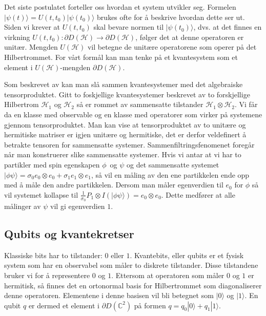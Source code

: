         Det siste postulatet forteller oss hvordan et system utvikler seg. Formelen $|\psi (t)\rangle = U(t,t_0)|\psi (t_0)\rangle$ brukes ofte for å beskrive hvordan dette ser ut. Siden vi krever at $U(t,t_0)$ skal bevare normen til $|\psi (t_0)\rangle$, dvs. at det finnes en virkning $U(t,t_0):\partial D(\mathcal{H})\rightarrow\partial D(\mathcal{H})$, følger det at denne operatoren er unitær. Mengden $U(\mathcal{H})$ vil betegne de unitære operatorene som operer på det Hilbertrommet. For vårt formål kan man tenke på et kvantesystem som et element i $U(\mathcal{H})$-mengden $\partial D(\mathcal{H})$.

        Som beskrevet av \cite{portugal_2019} kan man slå sammen kvantesystemer med det algebraiske tensorproduktet. Gitt to foskjellige kvantesystemer beskrevet av to forskjellige Hilbertrom $\mathcal{H}_1$ og $\mathcal{H}_2$ så er rommet av sammensatte tilstander $\mathcal{H}_1\otimes\mathcal{H}_2$. Vi får da en klasse med observable og en klasse med operatorer som virker på systemene gjennom tensorproduktet. Man kan vise at tensorproduktet av to unitære og hermitiske matriser er igjen unitære og hermitiske, det er derfor veldefinert å betrakte tensoren for sammensatte systemer. Sammenfiltringsfenomenet foregår når man konstruerer slike sammensatte systemer. Hvis vi antar at vi har to partikler med spin egenskapen $\phi$ og $\psi$ og det sammensatte systemet $|\phi\psi\rangle = \sigma_0e_0\otimes e_0 + \sigma_1e_1\otimes e_1$, så vil en måling av den ene partikkelen ende opp med å måle den andre partikkelen. Dersom man måler egenverdien til $e_0$ for $\phi$ så vil systemet kollapse til $\frac{1}{\sigma_0}P_1\otimes I(|\phi\psi\rangle) = e_0\otimes e_0$. Dette medfører at alle målinger av $\psi$ vil gi egenverdien $1$.

\subsection{Qubits og kvantekretser}
    
        Klassiske bits har to tilstander: $0$ eller $1$. Kvantebits, eller qubits er et fysisk system som har en observabel som måler to diskrete tilstander. Disse tilstandene bruker vi for å representere $0$ og $1$. Ettersom at operatoren som måler $0$ og $1$ er hermitisk, så finnes det en ortonormal basis for Hilbertrommet som diagonaliserer denne operatoren. Elementene i denne basisen vil bli betegnet som $|0\rangle$ og $|1\rangle$. En qubit $q$ er dermed et element i $\partial D(\mathbb{C}^2)$ på formen $q = q_0|0\rangle + q_1|1\rangle$. 

